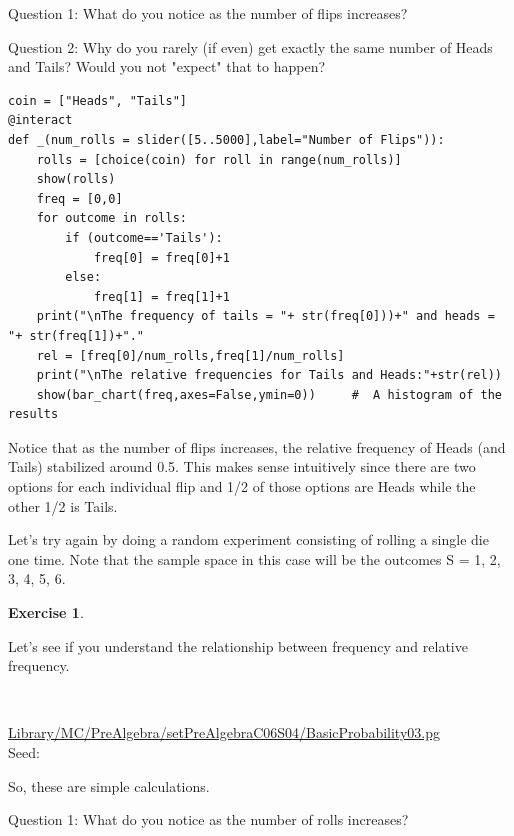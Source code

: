 \documentclass[10pt,]{book}
\theoremstyle{plain}
\theoremstyle{definition}
\theoremstyle{definition}
\theoremstyle{definition}
\newtheorem{exercise}[theorem]{Exercise}
\numberwithin{equation}{section}
\begin{document}
	Question 1: What do you notice as the number of flips increases?
\par

	Question 2: Why do you rarely (if even) get exactly the same number of Heads and Tails? Would you not "expect"
	that to happen?
\begin{lstlisting}[style=sageinput]
coin = ["Heads", "Tails"]
@interact
def _(num_rolls = slider([5..5000],label="Number of Flips")):
	rolls = [choice(coin) for roll in range(num_rolls)]
	show(rolls)   
	freq = [0,0]
	for outcome in rolls:
		if (outcome=='Tails'):
			freq[0] = freq[0]+1
		else:
			freq[1] = freq[1]+1
	print("\nThe frequency of tails = "+ str(freq[0]))+" and heads = "+ str(freq[1])+"."
	rel = [freq[0]/num_rolls,freq[1]/num_rolls]
	print("\nThe relative frequencies for Tails and Heads:"+str(rel))
	show(bar_chart(freq,axes=False,ymin=0))     #  A histogram of the results
\end{lstlisting}
\par
Notice that as the number of flips increases, the relative frequency of Heads (and Tails)
	stabilized around 0.5. This makes sense intuitively since there are two options for each 
	individual flip and 1/2 of those options are Heads while the other 1/2 is Tails.%
\par

	Let's try again
	by doing a random experiment consisting of rolling a single die one time. Note that the sample space 
	in this case will be the outcomes S = {1, 2, 3, 4, 5, 6}.
\begin{exercise}\label{exercise-5}

		Let's see if you understand the relationship between frequency and relative frequency.
\par\medskip
\mbox{}\\ %
\begin{mdframed}
{}\par\vspace*{2ex}%
{\tiny\ttfamily\noindent\url{Library/MC/PreAlgebra/setPreAlgebraC06S04/BasicProbability03.pg}\\Seed: \hfill}\end{mdframed}
\medskip\noindent 
		So, these are simple calculations.
\par
\end{exercise}
\par

	Question 1: What do you notice as the number of rolls increases?
\par
\end{document}
